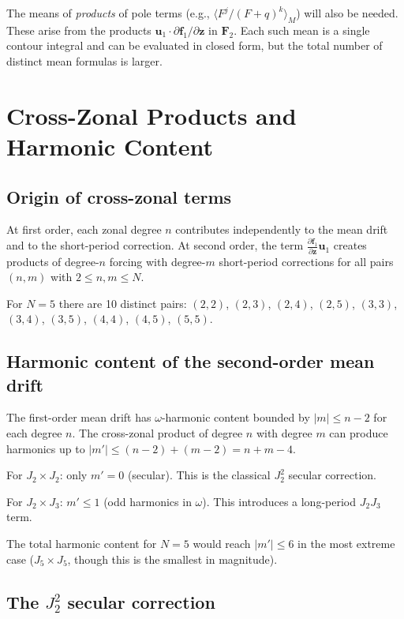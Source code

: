 \documentclass[11pt]{article}
\begin{document}
The means of \emph{products} of pole terms (e.g., $\langle F^j/(F+q)^k
\rangle_M$) will also be needed. These arise from the products
$\bm u_1 \cdot \partial \bm f_1/\partial \bm z$ in $\bm F_2$. Each such
mean is a single contour integral and can be evaluated in closed form, but
the total number of distinct mean formulas is larger.


\section{Cross-Zonal Products and Harmonic Content}

\subsection{Origin of cross-zonal terms}

At first order, each zonal degree $n$ contributes independently to the mean
drift and to the short-period correction. At second order, the term
$\frac{\partial \bm f_1}{\partial \bm z} \bm u_1$ creates products of
degree-$n$ forcing with degree-$m$ short-period corrections for all pairs
$(n, m)$ with $2 \le n, m \le N$.

For $N = 5$ there are 10 distinct pairs: $(2,2)$, $(2,3)$, $(2,4)$, $(2,5)$,
$(3,3)$, $(3,4)$, $(3,5)$, $(4,4)$, $(4,5)$, $(5,5)$.

\subsection{Harmonic content of the second-order mean drift}

The first-order mean drift has $\omega$-harmonic content bounded by $|m| \le
n - 2$ for each degree $n$. The cross-zonal product of degree $n$ with degree
$m$ can produce harmonics up to $|m'| \le (n-2) + (m-2) = n + m - 4$.

For $J_2 \times J_2$: only $m' = 0$ (secular). This is the classical
$J_2^2$ secular correction.

For $J_2 \times J_3$: $m' \le 1$ (odd harmonics in $\omega$). This
introduces a long-period $J_2 J_3$ term.

The total harmonic content for $N = 5$ would reach $|m'| \le 6$ in the most
extreme case ($J_5 \times J_5$, though this is the smallest in magnitude).

\subsection{The $J_2^2$ secular correction}
\end{document}
